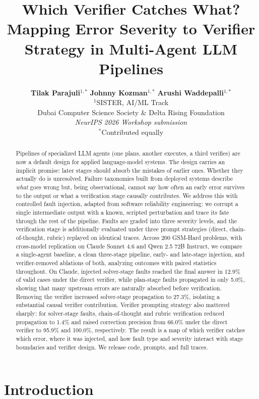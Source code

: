 \documentclass{article}
\title{Which Verifier Catches What? Mapping Error Severity to Verifier Strategy in Multi-Agent LLM Pipelines}
\author{
\textbf{Tilak Parajuli}$^{1,*}$ \qquad
\textbf{Johnny Kozman}$^{1,*}$ \qquad
\textbf{Arushi Waddepalli}$^{1,*}$\\[1.2em]
$^{1}$SISTER, AI/ML Track \\
Dubai Computer Science Society \& Delta Rising Foundation\\
\textit{NeurIPS 2026 Workshop submission}\\
\small $^{*}$Contributed equally\\
}
\begin{document}
\maketitle

\begin{abstract}
Pipelines of specialized LLM agents (one plans, another executes, a third
verifies) are now a default design for applied language-model systems.
The design carries an implicit promise: later stages should absorb the
mistakes of earlier ones. Whether they actually do is unresolved. Failure
taxonomies built from deployed systems describe \emph{what} goes wrong but,
being observational, cannot say how often an early error survives to the
output or what a verification stage causally contributes. We address this
with controlled fault injection, adapted from software reliability
engineering: we corrupt a single intermediate output with a known, scripted
perturbation and trace its fate through the rest of the pipeline. Faults are
graded into three severity levels, and the verification stage is additionally
evaluated under three prompt strategies (direct, chain-of-thought, rubric)
replayed on identical traces. Across 200 GSM-Hard problems, with cross-model
replication on Claude Sonnet 4.6 and Qwen 2.5 72B Instruct, we compare a
single-agent baseline, a clean three-stage pipeline, early- and late-stage
injection, and verifier-removed ablations of both, analyzing outcomes with
paired statistics throughout. On Claude, injected solver-stage faults reached
the final answer in 12.9\% of valid cases under the direct verifier, while
plan-stage faults propagated in only 5.0\%, showing that many upstream errors
are naturally absorbed before verification. Removing the verifier increased
solver-stage propagation to 27.3\%, isolating a substantial causal verifier
contribution. Verifier prompting strategy also mattered sharply: for
solver-stage faults, chain-of-thought and rubric verification reduced
propagation to 1.4\% and raised correction precision from 66.0\% under the
direct verifier to 95.9\% and 100.0\%, respectively. The result is a map of
which verifier catches which error, where it was injected, and how fault type
and severity interact with stage boundaries and verifier design. We release
code, prompts, and full traces.
\end{abstract}

\section{Introduction}
\end{document}

